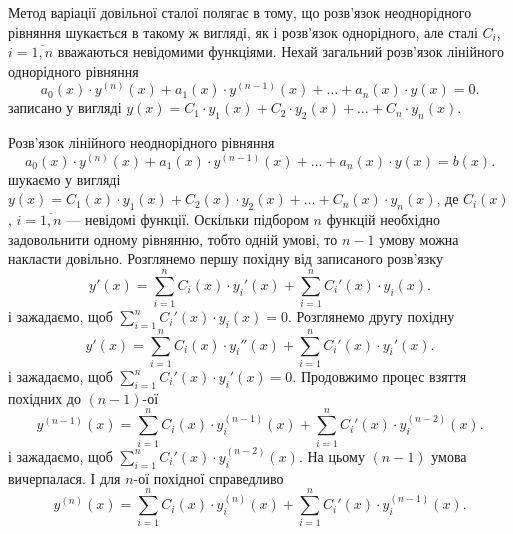 Метод варіації довільної сталої полягає в тому, що розв’язок неоднорідного рівняння шукається в такому ж вигляді, як і розв’язок однорідного, але сталі $C_i$, $i = \overline{1, n}$ вважаються невідомими функціями. Нехай загальний розв’язок лінійного однорідного рівняння
\begin{equation*}
	a_0(x) \cdot y^{(n)}(x) + a_1(x) \cdot y^{(n - 1)}(x) + \ldots + a_n(x) \cdot y(x) = 0.
\end{equation*}
записано у вигляді $y(x) = C_1 \cdot y_1(x) + C_2 \cdot y_2(x) + \ldots + C_n \cdot y_n(x)$. \parvskip

Розв’язок лінійного неоднорідного рівняння
\begin{equation*}
	a_0(x) \cdot y^{(n)}(x) + a_1(x) \cdot y^{(n - 1)}(x) + \ldots + a_n(x) \cdot y(x) = b(x).
\end{equation*}
шукаємо у вигляді $y(x) = C_1(x) \cdot y_1(x) + C_2(x) \cdot y_2(x) + \ldots + C_n(x) \cdot y_n(x)$, де $C_i(x)$, $i = \overline{1, n}$ --- невідомі функції. Оскільки підбором $n$ функцій необхідно задовольнити одному рівнянню, тобто одній умові, то $n - 1$ умову можна накласти довільно. Розглянемо першу похідну від записаного розв’язку
\begin{equation*}
	y'(x) = \sum_{i = 1}^n C_i(x) \cdot y_i'(x) + \sum_{i = 1}^n C_i'(x) \cdot y_i(x).
\end{equation*}
і зажадаємо, щоб $\sum_{i = 1}^n C_i'(x) \cdot y_i(x) = 0$. Розглянемо другу похідну
\begin{equation*}
	y'(x) = \sum_{i = 1}^n C_i(x) \cdot y_i''(x) + \sum_{i = 1}^n C_i'(x) \cdot y_i'(x).
\end{equation*}
і зажадаємо, щоб $\sum_{i = 1}^n C_i'(x) \cdot y_i'(x) = 0$. Продовжимо процес взяття похідних до $(n - 1)$-ої 
\begin{equation*}
	y^{(n - 1)}(x) = \sum_{i = 1}^n C_i(x) \cdot y_i^{(n - 1)}(x) + \sum_{i = 1}^n C_i'(x) \cdot y_i^{(n - 2)}(x).
\end{equation*}
і зажадаємо, щоб $\sum_{i = 1}^n C_i'(x) \cdot y_i^{(n - 2)}(x)$. На цьому $(n - 1)$ умова вичерпалася. І для $n$-ої похідної справедливо
\begin{equation*}
	y^{(n)}(x) = \sum_{i = 1}^n C_i(x) \cdot y_i^{(n)}(x) + \sum_{i = 1}^n C_i'(x) \cdot y_i^{(n - 1)}(x).
\end{equation*}

